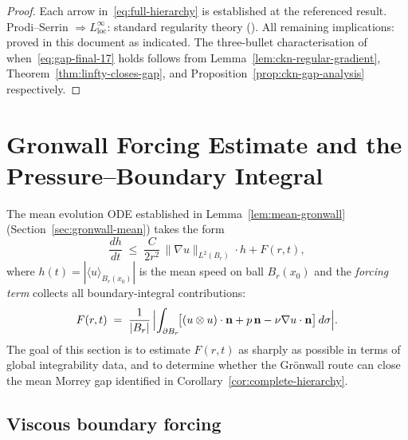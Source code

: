 \documentclass[11pt]{article}
\theoremstyle{definition}
\theoremstyle{remark}
\begin{document}
\begin{proof}
Each arrow in~\eqref{eq:full-hierarchy} is established at the referenced result.
Prodi--Serrin $\Rightarrow L^\infty_{\mathrm{loc}}$: standard regularity theory
(\cite{Serrin1962}).  All remaining implications: proved in this document as
indicated.  The three-bullet characterisation of when~\eqref{eq:gap-final-17}
holds follows from Lemma~\ref{lem:ckn-regular-gradient},
Theorem~\ref{thm:linfty-closes-gap}, and Proposition~\ref{prop:ckn-gap-analysis}
respectively.
\end{proof}

\section{Gronwall Forcing Estimate and the Pressure--Boundary Integral}
\label{sec:gronwall-forcing}

The mean evolution ODE established in Lemma~\ref{lem:mean-gronwall} (Section~\ref{sec:gronwall-mean}) takes the form
\begin{equation}\label{eq:mean-ode-18}
  \frac{dh}{dt} \;\leq\; \frac{C}{2r^{2}}\,\|\nabla u\|_{L^{2}(B_r)}\cdot h + F(r,t),
\end{equation}
where $h(t) = |\langle u \rangle_{B_r(x_0)}|$ is the mean speed on ball $B_r(x_0)$
and the \emph{forcing term} collects all boundary-integral contributions:
\begin{equation}\label{eq:forcing-def}
  F(r,t) \;=\; \frac{1}{|B_r|}\,
    \Bigl|\int_{\partial B_r}\!\bigl[(u\otimes u)\cdot\mathbf{n}
    + p\,\mathbf{n} - \nu\nabla u\cdot\mathbf{n}\bigr]\,d\sigma\Bigr|.
\end{equation}
The goal of this section is to estimate $F(r,t)$ as sharply as possible in terms of
global integrability data, and to determine whether the Gr\"{o}nwall route can close
the mean Morrey gap identified in Corollary~\ref{cor:complete-hierarchy}.

\subsection{Viscous boundary forcing}
\end{document}
